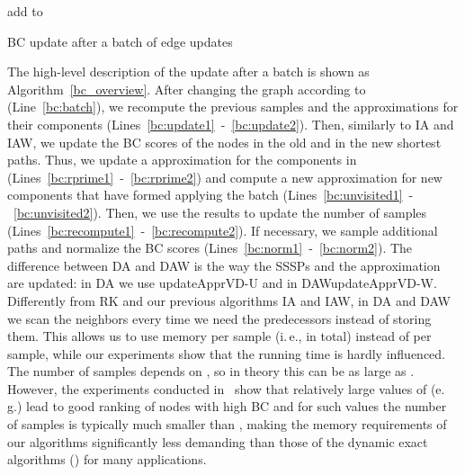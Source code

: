 \documentclass[english]{llncs}
\newcommand{\ie}{i.\,e.\xspace}
\newcommand{\eg}{e.\,g.\xspace}
\newcommand{\vd}{\xspace}
\newcommand{\rk}{\textsf{RK}\xspace}
\newcommand{\ia}{\textsf{IA}\xspace}
\newcommand{\iaw}{\textsf{IAW}\xspace}
\newcommand{\da}{\textsf{DA}\xspace}
\newcommand{\daw}{\textsf{DAW}\xspace}
\newcommand{\vda}{\xspace}
\newcommand{\upvd}{\textsf{updateApprVD-W}\xspace}
\newcommand{\upvdu}{\textsf{updateApprVD-U}\xspace}
\begin{document}
\begin{algorithm}[h]
\begin{small}
\LinesNumbered
{}
\applyBatch{}\; \label{bc:batch}
\For{ \KwTo }
{\label{bc:update1}
	 \updateApproxVDP{}\;\label{bc:dynsssp}
\replacePath{} 
}\label{bc:update2}
\ForEach{}
{\label{bc:rprime1}
	 \updateApproxVD{}\;
}\label{bc:rprime2}
{\label{bc:unvisited1}
	add  to \;
	 \computeApproxVD{}\;
}\label{bc:unvisited2}
\vda \; \label{bc:recompute1}
\; \label{bc:recompute2}
\If{}
{\label{bc:norm1}
	\sampleNewPaths{} 
	\ForEach{}
	{
		 \label{bc:norm1} 
	}
\;
}\label{bc:norm2}
\Return{}
\end{small}
\caption{BC update after a batch  of edge updates}
\label{bc_overview}
\end{algorithm}
The high-level description of the update after a batch  is shown as Algorithm~\ref{bc_overview}. 
After changing the graph according to  (Line~\ref{bc:batch}), we recompute the previous  samples and the \vd approximations for their components (Lines~\ref{bc:update1}~-~\ref{bc:update2}). Then, similarly to \ia and \iaw, we update the BC scores of the nodes in the old and in the new shortest paths. 
Thus, we update a \vd approximation for the components in  (Lines~\ref{bc:rprime1}~-~\ref{bc:rprime2}) and compute a new approximation for new components that have formed applying the batch (Lines~\ref{bc:unvisited1}~-~\ref{bc:unvisited2}). Then, we use the results to update the number of samples (Lines~\ref{bc:recompute1}~-~\ref{bc:recompute2}). If necessary, we sample additional paths and normalize the BC scores (Lines~\ref{bc:norm1}~-~\ref{bc:norm2}). The difference between \da and \daw is the way the SSSPs and the \vd approximation are updated: in \da we use \upvdu and in \daw \upvd. Differently from \rk and our previous algorithms \ia and \iaw, in \da and \daw we scan the neighbors every time we need the predecessors instead of storing them. This allows us to use  memory per sample (\ie,  in total) instead of  per sample, while our experiments show that the running time is hardly influenced. The number of samples depends on , so in theory this can be as large as . However, the experiments conducted in~\cite{DBLP:conf/alenex/BergaminiMS15} show that relatively large values of  (\eg ) lead to good ranking of nodes with high BC and for such values the number of samples is typically much smaller than , making the memory requirements of our algorithms significantly less demanding than those of the dynamic exact algorithms () for many applications.
\end{document}
